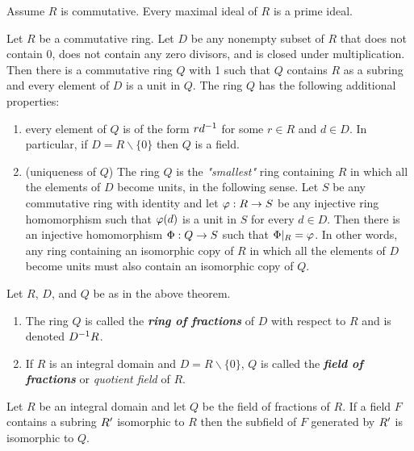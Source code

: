 \nl

\begin{cor}
Assume $R$ is commutative. Every maximal ideal of $R$ is a prime ideal.
\end{cor}

\nl

\begin{thm}
Let $R$ be a commutative ring. Let $D$ be any nonempty subset of $R$ that does not contain 0, does not contain any zero divisors, and is closed under multiplication. Then there is a commutative ring $Q$ with 1 such that $Q$ contains $R$ as a subring and every element of $D$ is a unit in $Q$. The ring $Q$ has the following additional properties:
\begin{enumerate}
\item every element of $Q$ is of the form $rd^{-1}$ for some $r\in R$ and $d\in D$. In particular, if $D = R\backslash\{0\}$ then $Q$ is a field.
\item (uniqueness of $Q$) The ring $Q$ is the \textit{"smallest"} ring containing $R$ in which all the elements of $D$ become units, in the following sense. Let $S$ be any commutative ring with identity and let $\varphi:R\rightarrow S$ be any injective ring homomorphism such that $\varphi(d)$ is a unit in $S$ for every $d\in D$. Then there is an injective homomorphism $\Phi:Q\rightarrow S$ such that $\Phi|_R = \varphi$. In other words, any ring containing an isomorphic copy of $R$ in which all the elements of $D$ become units must also contain an isomorphic copy of $Q$.
\end{enumerate}
\end{thm}

\nl

\begin{defn}
Let $R$, $D$, and $Q$ be as in the above theorem.
\begin{enumerate}
\item The ring $Q$ is called the \textit{\textbf{ring of fractions}} of $D$ with respect to $R$ and is denoted $D^{-1} R$.
\item If $R$ is an integral domain and $D = R\backslash\{0\}$, $Q$ is called the \textit{\textbf{field of fractions}} or \textit{quotient field} of $R$.
\end{enumerate}
\end{defn}

\nl

\begin{cor}
Let $R$ be an integral domain and let $Q$ be the field of fractions of $R$. If a field $F$ contains a subring $R^\prime$ isomorphic to $R$ then the subfield of $F$ generated by $R^\prime$ is isomorphic to $Q$.
\end{cor}


